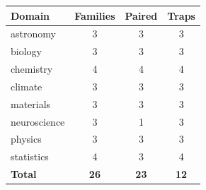 \begin{tabular}{@{}lccc@{}}
\toprule
Domain & Families & Paired & Traps \\
\midrule
astronomy & 3 & 3 & 3 \\
biology & 3 & 3 & 3 \\
chemistry & 4 & 4 & 4 \\
climate & 3 & 3 & 3 \\
materials & 3 & 3 & 3 \\
neuroscience & 3 & 1 & 3 \\
physics & 3 & 3 & 3 \\
statistics & 4 & 3 & 4 \\
\midrule
\textbf{Total} & \textbf{26} & \textbf{23} & \textbf{12} \\
\bottomrule
\end{tabular}
